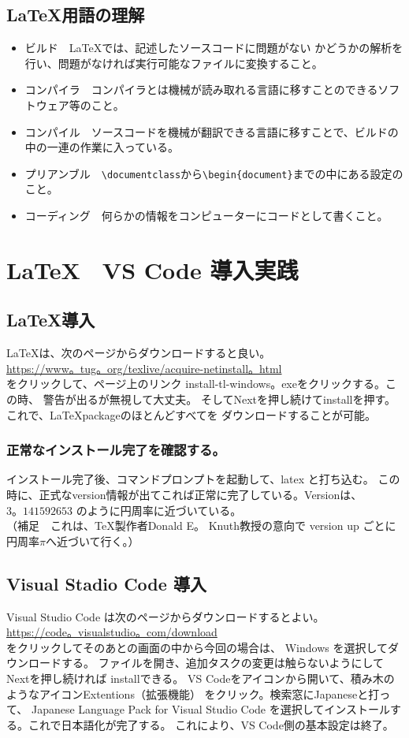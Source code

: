 \documentclass{ltjsarticle}
\begin{document}
\subsection{\LaTeX 用語の理解}
\begin{itemize}
  \item ビルド　\LaTeX では、記述したソースコードに問題がない
        かどうかの解析を行い、問題がなければ実行可能なファイルに変換すること。
  \item コンパイラ　コンパイラとは機械が読み取れる言語に移すことのできるソフトウェア等のこと。
  \item コンパイル　ソースコードを機械が翻訳できる言語に移すことで、ビルドの中の一連の作業に入っている。
  \item プリアンブル　\verb|\documentclass|から\verb|\begin{document}|までの中にある設定のこと。
  \item コーディング　何らかの情報をコンピューターにコードとして書くこと。
\end{itemize}
\section{\LaTeX　VS Code 導入実践}

\subsection{\LaTeX 導入}
\LaTeX は、次のページからダウンロードすると良い。\\
\url{https://www。tug。org/texlive/acquire-netinstall。html}\\
をクリックして、ページ上のリンク install-tl-windows。exeをクリックする。この時、
警告が出るが無視して大丈夫。
そしてNextを押し続けてinstallを押す。これで、\LaTeX packageのほとんどすべてを
ダウンロードすることが可能。
\subsubsection*{正常なインストール完了を確認する。}
インストール完了後、コマンドプロンプトを起動して、latex と打ち込む。
この時に、正式なversion情報が出てこれば正常に完了している。Versionは、$3。141592653$
のように円周率に近づいている。\\
（補足　これは、\TeX 製作者Donald E。 Knuth教授の意向で
version up ごとに円周率$\pi$へ近づいて行く。）
\subsection{Visual Stadio Code 導入}
Visual Studio Code は次のページからダウンロードするとよい。\\
\url{https://code。visualstudio。com/download}\\
をクリックしてそのあとの画面の中から今回の場合は、
Windows を選択してダウンロードする。
ファイルを開き、追加タスクの変更は触らないようにしてNextを押し続ければ
installできる。
VS Codeをアイコンから開いて、積み木のようなアイコンExtentions（拡張機能）
をクリック。検索窓にJapaneseと打って、
Japanese Language Pack for Visual Studio Code
を選択してインストールする。これで日本語化が完了する。
これにより、VS Code側の基本設定は終了。
\end{document}
